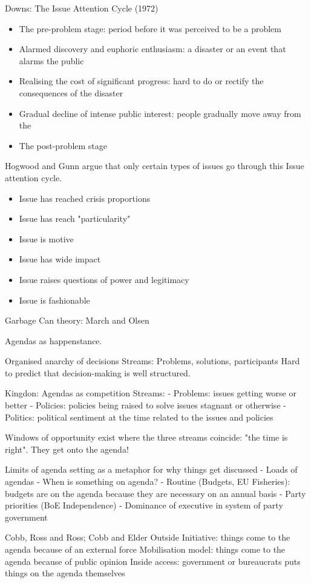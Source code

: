 \documentclass[12pt, letterpaper]{article}
\begin{document}
{Downs: The Issue Attention Cycle (1972)
\begin{itemize}
	\item The pre-problem stage: period before it was perceived to be a problem
	\item Alarmed discovery and euphoric enthusiasm: a disaster or an event that alarms the public
	\item Realising the cost of significant progress: hard to do or rectify the consequences of the disaster
	\item Gradual decline of intense public interest: people gradually move away from the
	\item The post-problem stage
\end{itemize}

Hogwood and Gunn argue that only certain types of issues go through this Issue attention cycle.
\begin{itemize}
	\item Issue has reached crisis proportions
	\item Issue has reach "particularity"
	\item Issue is motive
	\item Issue has wide impact
	\item Issue raises questions of power and legitimacy
	\item Issue is fashionable
\end{itemize}

Garbage Can theory: March and Olsen

Agendas as happenstance.

Organised anarchy of decisions
Streams:
Problems, solutions, participants
Hard to predict that decision-making is well structured. 

Kingdon: Agendas as competition
Streams:
- Problems: issues getting worse or better
- Policies: policies being raised to solve issues stagnant or otherwise
- Politics: political sentiment at the time related to the issues and policies

Windows of opportunity exist where the three streams coincide: "the time is right". They get onto the agenda!

Limits of agenda setting as a metaphor for why things get discussed
- Loads of agendas
- When is something on agenda?
- Routine (Budgets, EU Fisheries): budgets are on the agenda because they are necessary on an annual basis
- Party priorities (BoE Independence)
- Dominance of executive in system of party government

Cobb, Ross and Ross; Cobb and Elder
Outside Initiative: things come to the agenda because of an external force
Mobilisation model: things come to the agenda because of public opinion
Inside access: government or bureaucrats puts things on the agenda themselves

}
\end{document}
